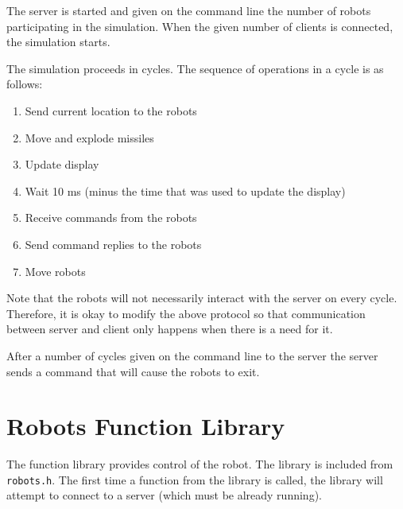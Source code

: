 \documentclass{article}
\begin{document}
        The server is started and given on the command line the number of
        robots participating in the simulation.  When the given number of
        clients is connected, the simulation starts.

        The simulation proceeds in cycles.  The sequence of operations in
        a cycle is as follows:
        \begin{enumerate}
        \item Send current location to the robots
        \item Move and explode missiles
        \item Update display
        \item Wait 10 ms (minus the time that was used to update the display)
        \item Receive commands from the robots
        \item Send command replies to the robots
        \item Move robots
        \end{enumerate}

        Note that the robots will not necessarily interact with the server
        on every cycle.  Therefore, it is okay to modify the above protocol
        so that communication between server and client only happens
        when there is a need for it.

        After a number of cycles given on the command line to the server
        the server sends a command that will cause the robots to exit.

\section{Robots Function Library}

        The function library provides control of the robot.  The library
        is included from \texttt{robots.h}.  The first time a function from
        the library is called, the library will attempt to connect to a server
        (which must be already running).
\end{document}
